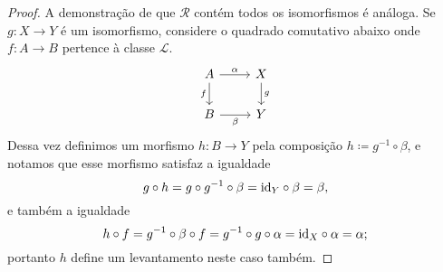 \begin{proof}
  A demonstração de que $\mathcal{R}$ contém todos os isomorfismos é análoga.
  Se $g: X \to Y$ é um isomorfismo, considere o quadrado comutativo abaixo onde $f: A \to B$ pertence à classe $\mathcal{L}$.
  \begin{displaymath}
     \begin{tikzcd}
      A
      \arrow[r, "\alpha"]
      \arrow[d, "f" swap]
      & X
      \arrow[d, "g"]
      \\ B
      \arrow[r, "\beta" swap]
      & Y
    \end{tikzcd}
  \end{displaymath}
  Dessa vez definimos um morfismo $h: B \to Y$ pela composição $h \coloneqq g^{-1} \circ \beta$, e notamos que esse morfismo satisfaz a igualdade
  \begin{displaymath}
    g \circ h
    = g \circ g^{-1} \circ \beta
    = \mathrm{id}_{Y} \circ \beta
    = \beta,
  \end{displaymath}
  e também a igualdade
  \begin{displaymath}
    h \circ f
    = g^{-1} \circ \beta \circ f
    = g^{-1} \circ g \circ \alpha
    = \mathrm{id}_{X} \circ \alpha
    = \alpha;
  \end{displaymath}
  portanto $h$ define um levantamento neste caso também.


\end{proof}
